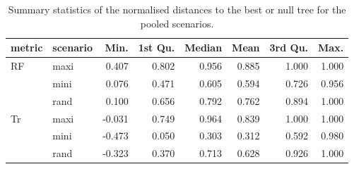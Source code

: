 \begin{table}[ht]
\centering
\begin{tabular}{llrrrrrr}
  \hline
metric & scenario & Min. & 1st Qu. & Median & Mean & 3rd Qu. & Max. \\ 
  \hline
RF & maxi & 0.407 & 0.802 & 0.956 & 0.885 & 1.000 & 1.000 \\ 
   & mini & 0.076 & 0.471 & 0.605 & 0.594 & 0.726 & 0.956 \\ 
   & rand & 0.100 & 0.656 & 0.792 & 0.762 & 0.894 & 1.000 \\ 
  Tr & maxi & -0.031 & 0.749 & 0.964 & 0.839 & 1.000 & 1.000 \\ 
   & mini & -0.473 & 0.050 & 0.303 & 0.312 & 0.592 & 0.980 \\ 
   & rand & -0.323 & 0.370 & 0.713 & 0.628 & 0.926 & 1.000 \\ 
   \hline
\end{tabular}
\caption{Summary statistics of the normalised distances to the best or null tree for the pooled scenarios.} 
\label{Tab_pooledscenarios}
\end{table}
